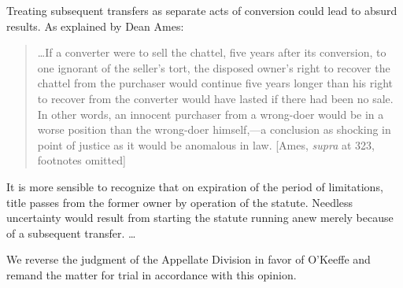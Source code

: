 Treating subsequent transfers as separate acts of conversion could lead to
absurd results. As explained by Dean Ames:
\begin{quote}
\ldots If a converter were to sell the chattel, five years after its
conversion, to one ignorant of the seller's tort, the disposed owner's right to
recover the chattel from the purchaser would continue five years longer than
his right to recover from the converter would have lasted if there had been no
sale. In other words, an innocent purchaser from a wrong-doer would be in a
worse position than the wrong-doer himself,---a conclusion as shocking in
point of justice as it would be anomalous in law. [Ames, \textit{supra} at 323,
footnotes omitted]
\end{quote}
It is more sensible to recognize that on expiration of the period of
limitations, title passes from the former owner by operation of the statute.
Needless uncertainty would result from starting the statute running anew merely
because of a subsequent transfer. \ldots

We reverse the judgment of the Appellate Division in favor of O'Keeffe and
remand the matter for trial in accordance with this opinion.

